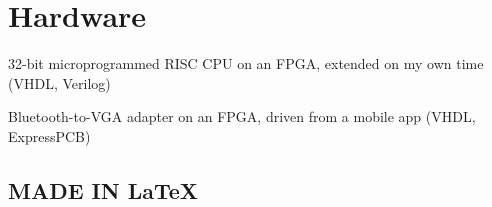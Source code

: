\documentclass[letterpaper]{deedy-resume} %
\begin{document}
\begin{minipage}[t]{0.33\textwidth}
\sectionspace %


\section{Hardware}
\vspace{\topsep}
\begin{tightitemize}
\item 32-bit microprogrammed RISC CPU on an FPGA, extended on my own time (VHDL, Verilog)
\item Bluetooth-to-VGA adapter on an FPGA, driven from a mobile app (VHDL, ExpressPCB)
\end{tightitemize}

\vspace{8 pt}

\subsection{MADE IN \LaTeX}


\end{minipage} %
\hfill
%
%
\end{document}
